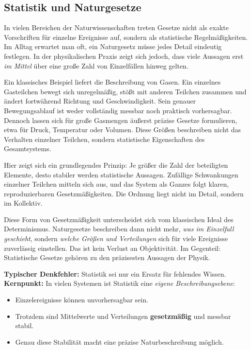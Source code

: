 \subsection{Statistik und Naturgesetze}

In vielen Bereichen der Naturwissenschaften
treten Gesetze nicht als exakte Vorschriften
für einzelne Ereignisse auf,
sondern als statistische Regelmäßigkeiten.
Im Alltag erwartet man oft,
ein Naturgesetz müsse jedes Detail eindeutig festlegen.
In der physikalischen Praxis zeigt sich jedoch,
dass viele Aussagen erst \emph{im Mittel}
über eine große Zahl von Einzelfällen hinweg gelten.

Ein klassisches Beispiel liefert die Beschreibung von Gasen.
Ein einzelnes Gasteilchen bewegt sich unregelmäßig,
stößt mit anderen Teilchen zusammen
und ändert fortwährend Richtung und Geschwindigkeit.
Sein genauer Bewegungsablauf
ist weder vollständig messbar
noch praktisch vorhersagbar.
Dennoch lassen sich für große Gasmengen
äußerst präzise Gesetze formulieren,
etwa für Druck, Temperatur oder Volumen.
Diese Größen beschreiben nicht das Verhalten einzelner Teilchen,
sondern statistische Eigenschaften des Gesamtsystems.

Hier zeigt sich ein grundlegendes Prinzip:
Je größer die Zahl der beteiligten Elemente,
desto stabiler werden statistische Aussagen.
Zufällige Schwankungen einzelner Teilchen
mitteln sich aus,
und das System als Ganzes
folgt klaren, reproduzierbaren Gesetzmäßigkeiten.
Die Ordnung liegt nicht im Detail,
sondern im Kollektiv.

Diese Form von Gesetzmäßigkeit
unterscheidet sich vom klassischen Ideal des Determinismus.
Naturgesetze beschreiben dann nicht mehr,
\emph{was im Einzelfall geschieht},
sondern \emph{welche Größen und Verteilungen}
sich für viele Ereignisse zuverlässig einstellen.
Das ist kein Verlust an Objektivität.
Im Gegenteil:
Statistische Gesetze gehören
zu den präzisesten Aussagen der Physik.

\begin{DidacticBox}
	\label{box:statistik}
	\small
	\textbf{Typischer Denkfehler:} Statistik sei nur ein Ersatz für fehlendes Wissen.\\
	\textbf{Kernpunkt:} In vielen Systemen ist Statistik eine \emph{eigene Beschreibungsebene}:
	\begin{itemize}
		\item Einzelereignisse können unvorhersagbar sein.
		\item Trotzdem sind Mittelwerte und Verteilungen \textbf{gesetzmäßig} und messbar stabil.
		\item Genau diese Stabilität macht eine präzise Naturbeschreibung möglich.
	\end{itemize}
\end{DidacticBox}

